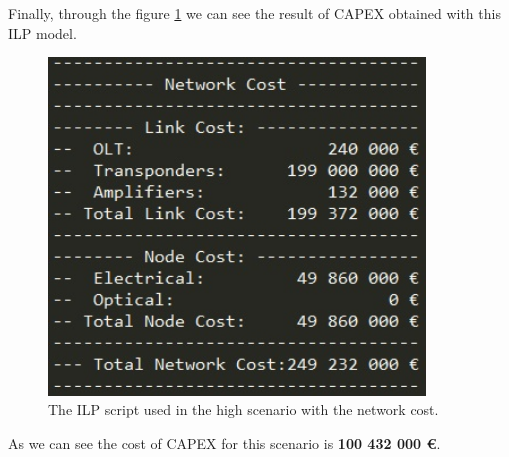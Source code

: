 Finally, through the figure \ref{scriptopaque_surv_protec_high} we can see the result of CAPEX obtained with this ILP model.\\

\newpage
\begin{figure}[h!]
\centering
\includegraphics[width=10cm]{sdf/ilp/opaque_protection/figures/script_opaque_protec_ref_high}
\caption{The ILP script used in the high scenario with the network cost.}
\label{scriptopaque_surv_protec_high}
\end{figure}

As we can see the cost of CAPEX for this scenario is \textbf{100 432 000 \euro}.\\

